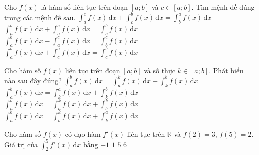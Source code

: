 

\begin{ex}%
	 Cho $f(x)$ là hàm số liên tục trên đoạn $[a;b]$ và $c \in[a;b]$. Tìm mệnh đề đúng trong các mệnh đề sau.
	 \choice
		{$\displaystyle\int_{a}^{c} f(x)\mathrm{\,d}x+\displaystyle\int_{c}^{b}  f(x) \mathrm{\,d}x=\displaystyle\int_{b}^{a} f(x) \mathrm{\,d}x$}
		{$\displaystyle\int_{a}^{b} f(x)\mathrm{\,d}x+\displaystyle\int_{a}^{c} f(x)  \mathrm{\,d}x=\displaystyle\int_{c}^{b} f(x)\mathrm{\,d}x$}
		{$\displaystyle\int_{a}^{b} f(x)\mathrm{\,d}x-\displaystyle\int_{a}^{c}  f(x) \mathrm{\,d}x=\displaystyle\int_{b}^{c} f(x)\mathrm{\,d}x$}
		{\True $\displaystyle\int_{a}^{b} f(x)\mathrm{\,d}x+\displaystyle\int_{c}^{a}  f(x) \mathrm{\,d}x=\displaystyle\int_{c}^{b} f(x)\mathrm{\,d}x$}
\end{ex}

\begin{ex}%
	Cho hàm số $f(x)$ liên tục trên  đoạn $[a;b]$ và số thực $k\in[a;b]$. Phát biểu nào sau đây đúng?
	 \choice
		 {\True $\displaystyle\int_{a}^{b}f(x)\mathrm{\,d}x=\displaystyle\int_{a}^{k}f(x)\mathrm{\,d}x+\displaystyle\int_{k}^{b}f(x)\mathrm{\,d}x$}
		 {$\displaystyle\int_{a}^{b}f(x)\mathrm{\,d}x=\displaystyle\int_{k}^{a}f(x)\mathrm{\,d}x+\displaystyle\int_{k}^{b}f(x)\mathrm{\,d}x$}
		 {$\displaystyle\int_{a}^{b}f(x)\mathrm{\,d}x=\displaystyle\int_{a}^{k}f(x)\mathrm{\,d}x+\displaystyle\int_{b}^{k}f(x)\mathrm{\,d}x$}
		{$\displaystyle\int_{a}^{b}f(x)\mathrm{\,d}x=\displaystyle\int_{b}^{k}f(x)\mathrm{\,d}x+\displaystyle\int_{k}^{a}f(x)\mathrm{\,d}x$} 
\end{ex}

\begin{ex}%
	Cho hàm số $f(x)$ có đạo hàm $f'(x)$ liên tục  trên $\mathbb{R}$ và $f(2)=3$, $f(5)=2$. Giá trị của $\displaystyle\int_2^5{f'(x)} \mathrm{\,d}x$ bằng
	\choice 
		{\True  $-1$}
		 {$1$}
		 {$5$}
		 {$6$}
\end{ex}

